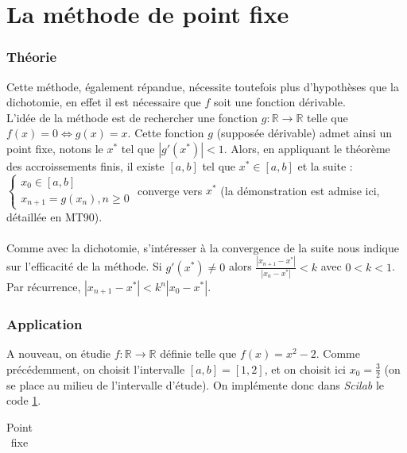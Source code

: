 \documentclass[a4paper,10pt]{report}
\begin{document}
\newpage
\section{La méthode de point fixe}
\subsubsection{Théorie}
Cette méthode, également répandue, nécessite toutefois plus d'hypothèses que la dichotomie, en effet il est nécessaire que $f$ soit une fonction dérivable.\\
\indent L'idée de la méthode est de rechercher une fonction $g : \mathbb{R} \longrightarrow \mathbb{R}$ telle que $f(x)=0 \Leftrightarrow g(x)=x$. Cette fonction $g$ (supposée dérivable) admet ainsi un point fixe, notons le $x^*$ tel que $|g'(x^*)|<1$. Alors, en appliquant le théorème des accroissements finis, il existe $[a,b]$ tel que $x^*\in[a,b]$ et la suite :\\
$
\left\lbrace
\begin{array}{l}
x_0\in[a,b]\\
x_{n+1}=g(x_n), n\geq0
\end{array}\right.
$ converge vers $x^*$ (la démonstration est admise ici, détaillée en MT90).\\ \\
\indent Comme avec la dichotomie, s'intéresser à la convergence de la suite nous indique sur l'efficacité de la méthode. Si $g'(x^*)\neq0$ alors $\frac{|x_{n+1}-x^*|}{|x_{n}-x^*|}<k$ avec $0<k<1$. \\
\noindent Par récurrence, $|x_{n+1}-x^*|<k^n|x_{0}-x^*|$.

\subsubsection{Application}
A nouveau, on étudie $f : \mathbb{R} \longrightarrow \mathbb{R}$ définie telle que $f(x)=x^2-2$. Comme précédemment, on choisit l'intervalle $[a,b]=[1,2]$, et on choisit ici $x_0=\frac{3}{2}$ (on se place au milieu de l'intervalle d'étude). On implémente donc dans \textit{Scilab} le code \ref{code_pointfixe}.

\begin{table}[H]
\caption{Point fixe}
\begin{tabular}{l}

\label{code_pointfixe}
\end{tabular}
\end{table}
\end{document}
